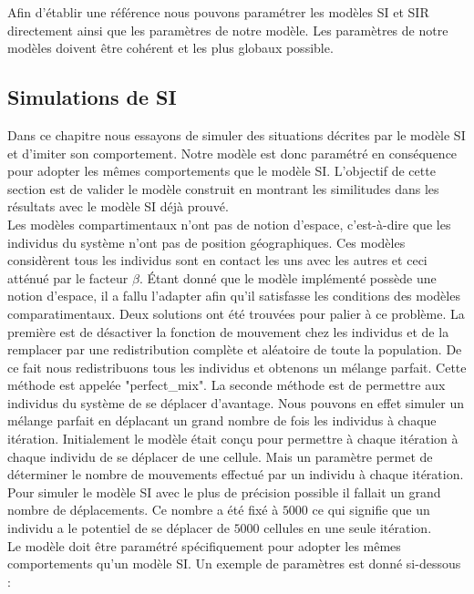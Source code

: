 Afin d'établir une référence nous pouvons paramétrer les modèles SI et SIR directement ainsi que les paramètres de notre modèle. Les paramètres de notre modèles doivent être cohérent et les plus globaux possible.\\

\subsection{Simulations de SI}

Dans ce chapitre nous essayons de simuler des situations décrites par le modèle SI et d'imiter son comportement. Notre modèle est donc paramétré en conséquence pour adopter les mêmes comportements que le modèle SI. L'objectif de cette section est de valider le modèle construit en montrant les similitudes dans les résultats avec le modèle SI déjà prouvé. \\

Les modèles compartimentaux n'ont pas de notion d'espace, c'est-à-dire que les individus du système n'ont pas de position géographiques. Ces modèles considèrent tous les individus sont en contact les uns avec les autres et ceci atténué par le facteur $\beta$. Étant donné que le modèle implémenté possède une notion d'espace, il a fallu l'adapter afin qu'il satisfasse les conditions des modèles comparatimentaux. Deux solutions ont été trouvées pour palier à ce problème. La première est de désactiver la fonction de mouvement chez les individus et de la remplacer par une redistribution complète et aléatoire de toute la population. De ce fait nous redistribuons tous les individus et obtenons un mélange parfait. Cette méthode est appelée "perfect\_mix". La seconde méthode est de permettre aux individus du système de se déplacer d'avantage. Nous pouvons en effet simuler un mélange parfait en déplacant un grand nombre de fois les individus à chaque itération. Initialement le modèle était conçu pour permettre à chaque itération à chaque individu de se déplacer de une cellule. Mais un paramètre permet de déterminer le nombre de mouvements effectué par un individu à chaque itération. Pour simuler le modèle SI avec le plus de précision possible il fallait un grand nombre de déplacements. Ce nombre a été fixé à $5000$ ce qui signifie que un individu a le potentiel de se déplacer de $5000$ cellules en une seule itération.\\

Le modèle doit être paramétré spécifiquement pour adopter les mêmes comportements qu'un modèle SI. Un exemple de paramètres est donné si-dessous : 

